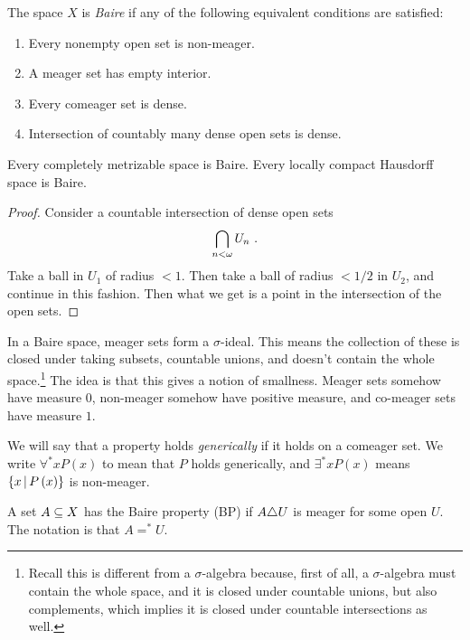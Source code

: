 \documentclass{amsart}
\begin{document}
\begin{defn}
The space $X$ is \emph{Baire} if any of the following equivalent conditions are satisfied:
\begin{enumerate}[label = (\iii)]
\item Every nonempty open set is non-meager.
\item A meager set has empty interior. 
\item Every comeager set is dense.
\item Intersection of countably many dense open sets is dense.
\end{enumerate}
\end{defn}

\begin{thm}
Every completely metrizable space is Baire.
Every locally compact Hausdorff space is Baire.
\end{thm}

\begin{proof}
Consider a countable intersection of dense open sets
\begin{equation}
\bigcap_{n<\omega} U_n\ .
\end{equation}
Take a ball in $U_1$ of radius $<1$. 
Then take a ball of radius $<1/2$ in $U_2$, and continue in this fashion.
Then what we get is a point in the intersection of the open sets.
\end{proof}

In a Baire space, meager sets form a $\sigma$-ideal. This means the collection of these is
closed under taking subsets, countable unions, and doesn't contain the whole
space.\footnote{Recall this is different from a $\sigma$-algebra because, first of all, a
$\sigma$-algebra must contain the whole space, and it is closed under
countable unions, but also complements, which implies it is closed under countable
intersections as well.}
The idea is that this gives a notion of smallness. Meager sets somehow have measure $0$, 
non-meager somehow have positive measure, and co-meager sets have measure $1$.

We will say that a property holds \emph{generically} if it holds on a comeager set.
We write $\forall^* x P\left( x \right)$ to mean that $P$ holds generically, 
and $\exists^* x P\left( x \right)$ means $\left\{ x\, \middle\vert \, P\left( x \right) \right\}$ is
non-meager.

\begin{defn}
A set $A\subseteq X$ has the Baire property (BP) if $A \triangle U$ is meager for some open $U$.
The notation is that $A=^* U$.
\end{defn}
\end{document}
